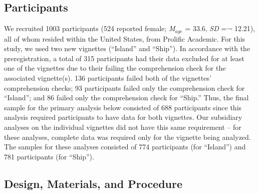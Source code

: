 \documentclass[
  man,floatsintext]{apa6}
\begin{document}
\hypertarget{participants}{%
\subsection{Participants}\label{participants}}

We recruited 1003 participants (524 reported female; \emph{M}\(_{age}\) = 33.6, \emph{SD} =¬ 12.21), all of whom resided within the United States, from Prolific Academic. For this study, we used two new vignettes (``Island'' and ``Ship''). In accordance with the preregistration, a total of 315 participants had their data excluded for at least one of the vignettes due to their failing the comprehension check for the associated vignette(s). 136 participants failed both of the vignettes' comprehension checks; 93 participants failed only the comprehension check for ``Island''; and 86 failed only the comprehension check for ``Ship.'' Thus, the final sample for the primary analysis below consisted of 688 participants since this analysis required participants to have data for both vignettes. Our subsidiary analyses on the individual vignettes did not have this same requirement -- for these analyses, complete data was required only for the vignette being analyzed. The samples for these analyses consisted of 774 participants (for ``Island'') and 781 participants (for ``Ship'').

\hypertarget{design-materials-and-procedure}{%
\subsection{Design, Materials, and Procedure}\label{design-materials-and-procedure}}
\end{document}
